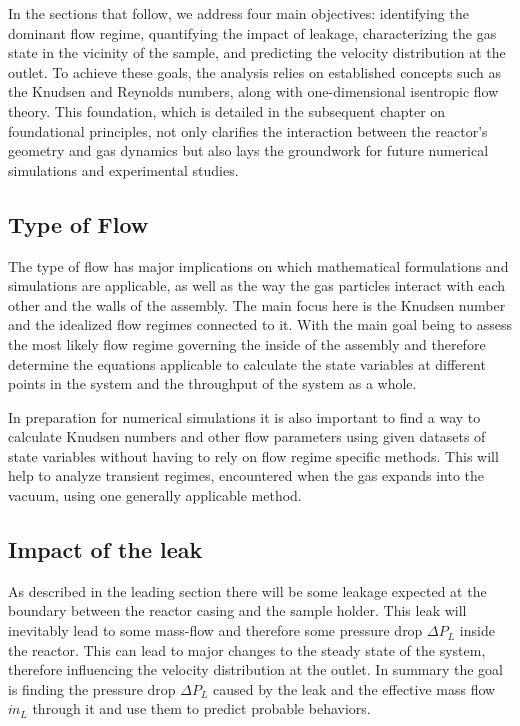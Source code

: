 	In the sections that follow, we address four main objectives: identifying the dominant flow regime, quantifying the impact of leakage, characterizing the gas state in the vicinity of the sample, and predicting the velocity distribution at the outlet.
	To achieve these goals, the analysis relies on established concepts such as the Knudsen and Reynolds numbers, along with one-dimensional isentropic flow theory.
	This foundation, which is detailed in the subsequent chapter on foundational principles, not only clarifies the interaction between the reactor’s geometry and gas dynamics but also lays the groundwork for future numerical simulations and experimental studies.	
\subsection{Type of Flow}
	The type of flow has major implications on which mathematical formulations and simulations are applicable, as well as the way the gas particles interact with each other and the walls of the assembly. 
	The main focus here is the Knudsen number and the idealized flow regimes connected to it.
	With the main goal being to assess the most likely flow regime governing the inside of the assembly and therefore determine the equations applicable to calculate the state variables at different points in the system and the throughput of the system as a whole.

	In preparation for numerical simulations it is also important to find a way to calculate Knudsen numbers and other flow parameters using given datasets of state variables without having to rely on flow regime specific methods. This will help to analyze transient regimes, encountered when the gas expands into the vacuum, using one generally applicable method.  

\subsection{Impact of the leak}
	As described in the leading section there will be some leakage expected at the boundary between the reactor casing and the sample holder.
	This leak will inevitably lead to some mass-flow and therefore some pressure drop $\Delta P_L$ inside the reactor.
	This can lead to major changes to the steady state of the system, therefore influencing the velocity distribution at the outlet.
	In summary the goal is finding the pressure drop $\Delta P_L$ caused by the leak and the effective mass flow $\dot{m}_L$ through it and use them to predict probable behaviors.

